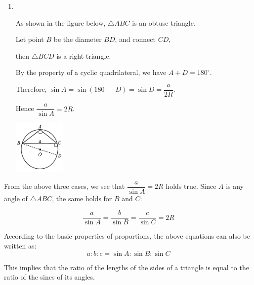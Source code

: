 \documentclass{report}
\begin{document}
\begin{enumerate}[label=(\arabic*)]
    \vspace{-3em}
    \item \parbox[t][][t]{0.9\textwidth}{
        ~
        \vspace{-1.1em}
        \begin{vwcol}[widths={0.7,0.3}, sep=8mm, rule=0pt]
            As shown in the figure below, $\triangle ABC$ is an obtuse triangle. 
            
            \noindent Let point $B$ be the diameter $BD$, and connect $CD$, 
            
            \noindent then $\triangle BCD$ is a right triangle. 
            
            \noindent By the property of a cyclic quadrilateral, we have $A+D=180^\circ$. 
            
            \noindent Therefore, $\sin A=\sin (180^\circ-D)=\sin D=\dfrac{a}{2R}$.

            \noindent Hence $\dfrac{a}{\sin A}=2R$.
    
            \parbox{0.2\textwidth}{
                \vspace{1em}
                \includegraphics[width=0.2\textwidth]{assets/10-12.jpg}
            }
        \end{vwcol}
    }
    \end{enumerate}

    From the above three cases, we see that $\dfrac{a}{\sin A}=2R$ holds true. Since $A$ is any angle of $\triangle ABC$, the same holds for $B$ and $C$:
    
    \begin{info}
        $$
            \dfrac{a}{\sin A}=\dfrac{b}{\sin B}=\dfrac{c}{\sin C}=2R
        $$
    \end{info}

    According to the basic properties of proportions, the above equations can also be written as:
    $$
    a: b: c=\sin A: \sin B: \sin C
    $$

    \vspace{-1em}
    This implies that the ratio of the lengths of the sides of a triangle is equal to the ratio of the sines of its angles.
\end{document}
